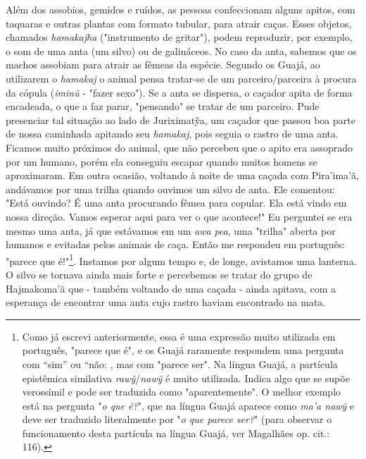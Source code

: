 Além dos assobios, gemidos e ruídos, as pessoas confeccionam alguns
apitos, com taquaras e outras plantas com formato tubular, para atrair
caças. Esses objetos, chamados \emph{hamakajha} ("instrumento de
gritar"), podem reproduzir, por exemplo, o som de uma anta (um silvo) ou
de galináceos. No caso da anta, sabemos que os machos assobiam para
atrair as fêmeas da espécie. Segundo os Guajá, ao utilizarem o
\emph{hamakaj} o animal pensa tratar-se de um parceiro/parceira à
procura da cópula (\emph{iminũ} - "fazer sexo"). Se a anta se dispersa,
o caçador apita de forma encadeada, o que a faz parar, "pensando" se
tratar de um parceiro. Pude presenciar tal situação ao lado de
Juriximatỹa, um caçador que passou boa parte de nossa caminhada apitando
seu \emph{hamakaj}, pois seguia o rastro de uma anta. Ficamos muito
próximos do animal, que não percebeu que o apito era assoprado por um
humano, porém ela conseguiu escapar quando muitos homens se aproximaram.
Em outra ocasião, voltando à noite de uma caçada com Pira'ima'ã,
andávamos por uma trilha quando ouvimos um silvo de anta. Ele comentou:
"Está ouvindo? É uma anta procurando fêmea para copular. Ela está vindo
em nossa direção. Vamos esperar aqui para ver o que acontece!" Eu
perguntei se era mesmo uma anta, já que estávamos em um \emph{awa}
\emph{pea}, uma "trilha" aberta por humanos e evitadas pelos animais de
caça. Então me respondeu em português: "parece que é!"\footnote{Como já
  escrevi anteriormente, essa é uma expressão muito utilizada em
  português, "parece que é", e os Guajá raramente respondem uma pergunta
  com ``sim'' ou ``não: , mas com "parece ser". Na língua Guajá, a
  partícula epistêmica similativa \emph{rawỹ}/\emph{nawỹ} é muito
  utilizada. Indica algo que se supõe verossímil e pode ser traduzida
  como "aparentemente". O melhor exemplo está na pergunta "\emph{o que
  é?}", que na língua Guajá aparece como \emph{ma'a nawỹ} e deve ser
  traduzido literalmente por "\emph{o que parece ser?}" (para observar o
  funcionamento desta partícula na língua Guajá, ver Magalhães op. cit.:
  116).}. Instamos por algum tempo e, de longe, avistamos uma lanterna.
O silvo se tornava ainda mais forte e percebemos se tratar do grupo de
Hajmakoma'ã que - também voltando de uma caçada - ainda apitava, com a
esperança de encontrar uma anta cujo rastro haviam encontrado na mata.

